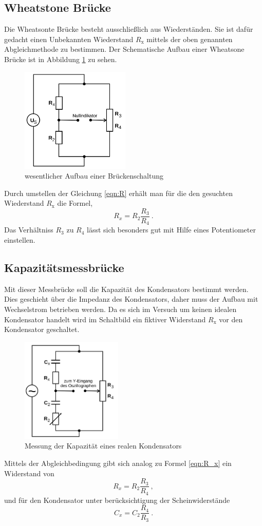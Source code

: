 \subsection{Wheatstone Brücke}
Die Wheatsonte Brücke besteht ausschließlich aus Wiederständen. Sie ist dafür gedacht einen Unbekannten Wiederstand $R_\text{x}$ mittels der oben genannten Abgleichmethode zu bestimmen. Der Schematische Aufbau einer Wheatsone Brücke ist in Abbildung \ref{fig:widerstand} zu sehen. 
\begin{figure}
      \centering
      \includegraphics[height=5cm]{picture/2.png}
      \caption{wesentlicher Aufbau einer Brückenschaltung}
      \label{fig:widerstand}
\end{figure}
Durch umstellen der Gleichung \ref{eqn:R} erhält man für die den gesuchten Wiederstand $R_\text{x}$ die Formel, 
\begin{equation}
  R_x = R_2 \frac{R_3}{R_4} \ .
  \label{eqn:R_x}
\end{equation}
Das Verhältniss $R_3$ zu $R_4$ lässt sich besonders gut mit Hilfe eines Potentiometer einstellen.
\subsection{Kapazitätsmessbrücke}
Mit dieser Messbrücke soll die Kapazität des Kondensators bestimmt werden. Dies geschieht über die Impedanz des Kondensators, daher muss der Aufbau mit Wechselstrom betrieben werden. Da es sich im Versuch um keinen idealen Kondensator handelt wird im Schaltbild ein fiktiver Widerstand $R_\text{x}$ vor den Kondensator geschaltet.
\begin{figure}
  \centering
  \includegraphics[height=5cm]{picture/3.png}
  \caption{Messung der Kapazität eines realen Kondensators}
  \label{fig:C}
\end{figure}
Mittels der Abgleichbedingung gibt sich analog zu Formel \ref{eqn:R_x} ein Widerstand von 
\begin{equation*}
    R_x = R_2 \frac{R_3}{R_4} \ ,
\end{equation*}
und für den Kondensator unter berücksichtigung der Scheinwiderstände
\begin{equation}
  C_x = C_2 \frac{R_4}{R_3} \ .
  \label{C_x}
\end{equation}

